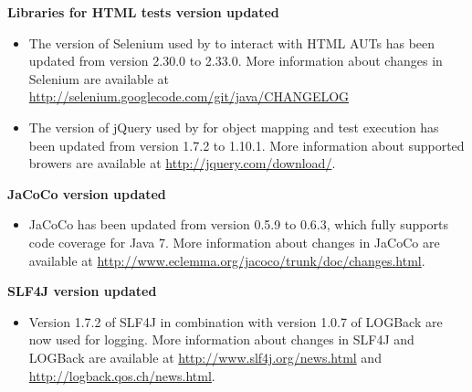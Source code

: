 \textbf{Libraries for HTML tests version updated}
\begin{itemize}
\item The version of Selenium used by \ite to interact with HTML AUTs has been
    updated from version 2.30.0 to 2.33.0. More information about changes
    in Selenium are available at
    \url{http://selenium.googlecode.com/git/java/CHANGELOG}
\item The version of jQuery used by \ite for object mapping and test execution
    has been updated from version 1.7.2 to 1.10.1. More information about
    supported browers are available at \url{http://jquery.com/download/}.
\end{itemize}

\textbf{JaCoCo version updated}
\begin{itemize}
\item JaCoCo has been updated from version 0.5.9 to 0.6.3, which fully supports
    code coverage for Java 7. More information about changes in JaCoCo are
    available at
    \url{http://www.eclemma.org/jacoco/trunk/doc/changes.html}.
\end{itemize}

\textbf{SLF4J version updated}
\begin{itemize}
\item Version 1.7.2 of SLF4J in combination with version 1.0.7 of LOGBack
    are now used for logging. More information about changes in SLF4J and
    LOGBack are available at
    \url{http://www.slf4j.org/news.html} and
    \url{http://logback.qos.ch/news.html}.
\end{itemize}

